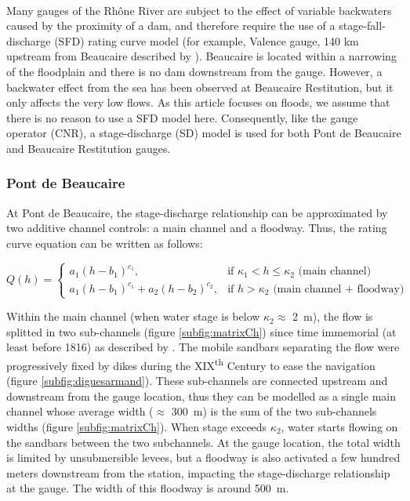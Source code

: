 \documentclass[11pt]{article}
\begin{document}
	\paragraph{} Many gauges of the Rhône River are subject to the effect of variable backwaters caused by the proximity of a dam, and therefore require the use of a stage-fall-discharge (SFD) rating curve model (for example, Valence gauge, 140 km upstream from Beaucaire described by \cite{mansanarez_non-unique_2016}). Beaucaire is located within a narrowing of the floodplain and there is no dam downstream from the gauge. However, a backwater effect from the sea has been observed at Beaucaire Restitution, but it only affects the very low flows. As this article focuses on floods, we assume that there is no reason to use a SFD model here. Consequently, like the gauge operator (CNR), a stage-discharge (SD) model is used for both Pont de Beaucaire and Beaucaire Restitution gauges.
                
        \subsubsection{Pont de Beaucaire}
        
         At Pont de Beaucaire, the stage-discharge relationship can be approximated by two additive channel controls: a main channel and a floodway. Thus, the rating curve equation can be written as follows: 

        \begin{equation}
        Q(h) =
          \begin{cases}
           a_1(h-b_1)^{c_1}, & \text{if $\kappa_1 < h \leq \kappa_2$ (main channel) }\\
           a_1(h-b_1)^{c_1}+ a_2(h-b_2)^{c_2}, & \text{if $h > \kappa_2$ (main channel + floodway)}
          \end{cases}
          \label{eq:RcPt}
        \end{equation}

    Within the main channel (when water stage is below $\kappa_2 \approx$ 2~m), the flow is splitted in two sub-channels (figure \ref{subfig:matrixCh}) since time immemorial (at least before 1816) as described by \citet{armand_ii_1907}. The mobile sandbars separating the flow were progressively fixed by dikes during the XIX\textsuperscript{th} Century to ease the navigation (figure \ref{subfig:diguesarmand}). These sub-channels are connected upstream and downstream from the gauge location, thus they can be modelled as a single main channel whose average width ($\approx$ 300~m) is the sum of the two sub-channels widths (figure \ref{subfig:matrixCh}). When stage exceeds $\kappa_2$, water starts flowing on the sandbars between the two subchannels. At the gauge location, the total width is limited by unsubmersible levees, but a floodway is also activated a few hundred meters downstream from the station, impacting the stage-discharge relationship at the gauge. The width of this floodway is around 500~m.   
\end{document}
